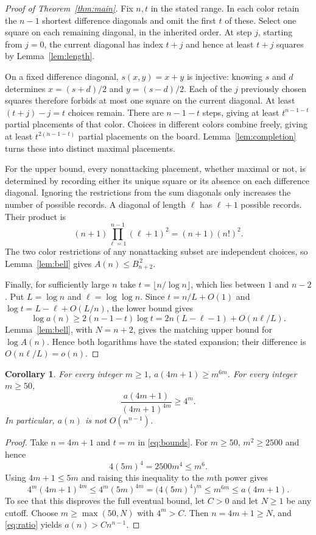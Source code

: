 \documentclass[11pt]{article}
\newtheorem{corollary}[theorem]{Corollary}
\begin{document}
\begin{proof}[Proof of Theorem~\ref{thm:main}]
Fix $n,t$ in the stated range. In each color retain the $n-1$ shortest
difference diagonals and omit the first $t$ of these. Select one square on
each remaining diagonal, in the inherited order. At step $j$, starting
from $j=0$, the current diagonal has index $t+j$ and hence at least $t+j$
squares by Lemma~\ref{lem:length}.

On a fixed difference diagonal, $s(x,y)=x+y$ is injective: knowing $s$ and
$d$ determines $x=(s+d)/2$ and $y=(s-d)/2$.
Each of the $j$ previously chosen squares therefore forbids at most one
square on the current diagonal. At least $(t+j)-j=t$ choices remain.
There are $n-1-t$ steps, giving at least $t^{n-1-t}$ partial placements
of that color. Choices in different colors combine freely, giving at least
$t^{2(n-1-t)}$ partial placements on the board.
Lemma~\ref{lem:completion} turns these into distinct maximal placements.

For the upper bound, every nonattacking placement, whether maximal or not,
is determined by recording either its unique square or its absence on each
difference diagonal. Ignoring the restrictions from the sum diagonals only
increases the number of possible records. A diagonal of length $\ell$
has $\ell+1$ possible records. Their product is
\[
 (n+1)\prod_{\ell=1}^{n-1}(\ell+1)^2=(n+1)(n!)^2.
\]
The two color restrictions of any nonattacking subset are independent
choices, so Lemma~\ref{lem:bell} gives $A(n)\leq B_{n+2}^{\,2}$.

Finally, for sufficiently large $n$ take $t=\lfloor n/\log n\rfloor$,
which lies between $1$ and $n-2$.
Put $L=\log n$ and $\ell=\log\log n$. Since
$t=n/L+O(1)$ and $\log t=L-\ell+O(L/n)$, the lower bound gives
\[
 \log a(n)\geq2(n-1-t)\log t
 =2n(L-\ell-1)+O(n\ell/L).
\]
Lemma~\ref{lem:bell}, with $N=n+2$, gives the matching upper bound
for $\log A(n)$. Hence both logarithms have the stated expansion;
their difference is $O(n\ell/L)=o(n)$.
\end{proof}

\begin{corollary}\label{cor:refutation}
For every integer $m\geq1$, $a(4m+1)\geq m^{6m}$.
For every integer $m\geq50$,
\begin{equation}\label{eq:ratio}
 \frac{a(4m+1)}{(4m+1)^{4m}}\geq4^m.
\end{equation}
In particular, $a(n)$ is not $O(n^{n-1})$.
\end{corollary}
\begin{proof}
Take $n=4m+1$ and $t=m$ in \eqref{eq:bounds}.
For $m\geq50$, $m^2\geq2500$ and hence
\[
 4(5m)^4=2500m^4\leq m^6.
\]
Using $4m+1\leq5m$ and raising this inequality to the $m$th power gives
\[
 4^m(4m+1)^{4m}\leq4^m(5m)^{4m}
   =\bigl(4(5m)^4\bigr)^m\leq m^{6m}\leq a(4m+1).
\]
To see that this disproves the full eventual bound, let $C>0$ and let
$N\geq1$ be any cutoff. Choose $m\geq\max(50,N)$ with $4^m>C$.
Then $n=4m+1\geq N$, and \eqref{eq:ratio} yields
$a(n)>Cn^{n-1}$.
\end{proof}
\end{document}
